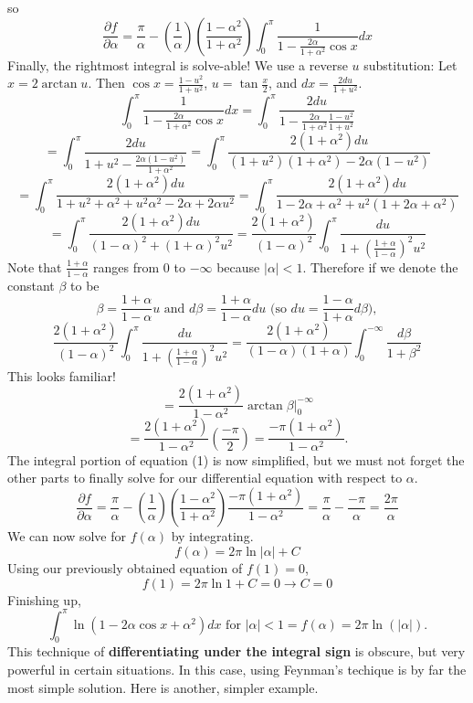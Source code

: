 \documentclass{article}
\begin{document}
so
\begin{equation}
    \frac{\partial f}{\partial \alpha} = \frac{\pi}{\alpha}-(\frac{1}{\alpha})(\frac{1-\alpha^2}{1+\alpha^2})\int_{0}^{\pi}\frac{1}{1-\frac{2\alpha}{1+\alpha^2}\cos{x}}dx
\end{equation}
Finally, the rightmost integral is solve-able! We use a reverse $u$ substitution: Let $x=2\arctan{u}$. Then $\cos{x}=\frac{1-u^2}{1+u^2}$, $u=\tan{\frac{x}{2}}$, and $dx=\frac{2du}{1+u^2}$.
$$\int_{0}^{\pi}\frac{1}{1-\frac{2\alpha}{1+\alpha^2}\cos{x}}dx = \int_{0}^{\pi}\frac{2du}{1-\frac{2\alpha}{1+\alpha^2}\frac{1-u^2}{1+u^2}}$$
$$= \int_{0}^{\pi}\frac{2du}{1+u^2-\frac{2\alpha(1-u^2)}{1+\alpha^2}} = \int_{0}^{\pi}\frac{2(1+\alpha^2)du}{(1+u^2)(1+\alpha^2)-2\alpha(1-u^2)}$$
$$= \int_{0}^{\pi}\frac{2(1+\alpha^2)du}{1+u^2+\alpha^2+u^2\alpha^2-2\alpha+2\alpha u^2} = \int_{0}^{\pi}\frac{2(1+\alpha^2)du}{1-2\alpha+\alpha^2+u^2(1+2\alpha+\alpha^2)}$$
$$= \int_{0}^{\pi}\frac{2(1+\alpha^2)du}{(1-\alpha)^2+(1+\alpha)^2u^2} = \frac{2(1+\alpha^2)}{(1-\alpha)^2}\int_{0}^{\pi}\frac{du}{1+(\frac{1+\alpha}{1-\alpha})^2u^2}$$
Note that $\frac{1+\alpha}{1-\alpha}$ ranges from 0 to $-\infty$ because $|\alpha|<1$. Therefore if we denote the constant $\beta$ to be $$\beta=\frac{1+\alpha}{1-\alpha}u \text{ and } d\beta=\frac{1+\alpha}{1-\alpha}du \text { (so } du=\frac{1-\alpha}{1+\alpha}d\beta \text{)},$$
$$\frac{2(1+\alpha^2)}{(1-\alpha)^2}\int_{0}^{\pi}\frac{du}{1+(\frac{1+\alpha}{1-\alpha})^2u^2} = \frac{2(1+\alpha^2)}{(1-\alpha)(1+\alpha)}\int_{0}^{-\infty}\frac{d\beta}{1+\beta^2}$$
This looks familiar!
$$= \frac{2(1+\alpha^2)}{1-\alpha^2}\arctan{\beta}\bigg\vert_{0}^{-\infty}$$
$$= \frac{2(1+\alpha^2)}{1-\alpha^2}(\frac{-\pi}{2}) = \frac{-\pi(1+\alpha^2)}{1-\alpha^2}.$$
The integral portion of equation (1) is now simplified, but we must not forget the other parts to finally solve for our differential equation with respect to $\alpha$.
$$\frac{\partial f}{\partial \alpha} = \frac{\pi}{\alpha}-(\frac{1}{\alpha})(\frac{1-\alpha^2}{1+\alpha^2})\frac{-\pi(1+\alpha^2)}{1-\alpha^2} = \frac{\pi}{\alpha}-\frac{-\pi}{\alpha} = \frac{2\pi}{\alpha}$$
We can now solve for $f(\alpha)$ by integrating.
$$f(\alpha) = 2\pi\ln{|\alpha|}+C$$
Using our previously obtained equation of $f(1)=0$,
$$f(1)=2\pi\ln{1}+C=0 \rightarrow C=0$$
Finishing up,
$$\int_{0}^{\pi} \ln(1-2\alpha\cos{x}+\alpha^2)dx \text{ for } |\alpha|<1 = f(\alpha) = \boxed{2\pi\ln(|\alpha|)}.$$ 
This technique of \textbf{differentiating under the integral sign} is obscure, but very powerful in certain situations. In this case, using Feynman's techique is by far the most simple solution. Here is another, simpler example.
\end{document}
